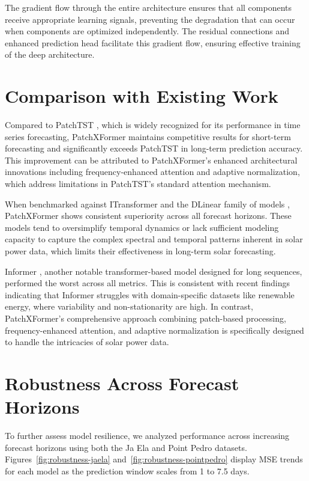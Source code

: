 \documentclass[12pt]{uomthesis}
\begin{document}
The gradient flow through the entire architecture ensures that all components receive appropriate learning signals, preventing the degradation that can occur when components are optimized independently. The residual connections and enhanced prediction head facilitate this gradient flow, ensuring effective training of the deep architecture.



\section{Comparison with Existing Work}

Compared to PatchTST \cite{nie2022patchtst}, which is widely recognized for its performance in time series forecasting, PatchXFormer maintains competitive results for short-term forecasting and significantly exceeds PatchTST in long-term prediction accuracy. This improvement can be attributed to PatchXFormer's enhanced architectural innovations including frequency-enhanced attention and adaptive normalization, which address limitations in PatchTST's standard attention mechanism.

When benchmarked against ITransformer and the DLinear family of models \cite{zeng2023transformers}, PatchXFormer shows consistent superiority across all forecast horizons. These models tend to oversimplify temporal dynamics or lack sufficient modeling capacity to capture the complex spectral and temporal patterns inherent in solar power data, which limits their effectiveness in long-term solar forecasting.

Informer \cite{zhou2021informer}, another notable transformer-based model designed for long sequences, performed the worst across all metrics. This is consistent with recent findings indicating that Informer struggles with domain-specific datasets like renewable energy, where variability and non-stationarity are high. In contrast, PatchXFormer's comprehensive approach combining patch-based processing, frequency-enhanced attention, and adaptive normalization is specifically designed to handle the intricacies of solar power data.

\section{Robustness Across Forecast Horizons}

To further assess model resilience, we analyzed performance across increasing forecast horizons using both the Ja Ela and Point Pedro datasets. Figures~\ref{fig:robustness-jaela} and~\ref{fig:robustness-pointpedro} display MSE trends for each model as the prediction window scales from 1 to 7.5 days.
\end{document}
